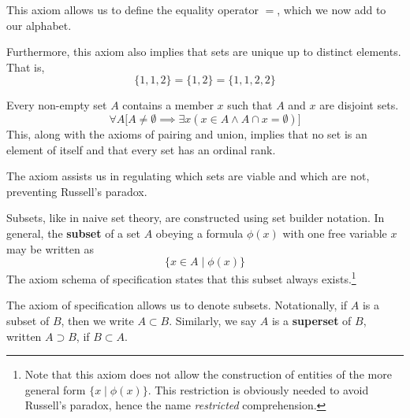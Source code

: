 \documentclass{article}
\begin{document}
    \begin{definition}[Equality]
      This axiom allows us to define the equality operator $=$, which we now add to our alphabet. 
    \end{definition}

    \begin{theorem}
      Furthermore, this axiom also implies that sets are unique up to distinct elements. That is, 
      \begin{equation}
        \{1, 1, 2\} = \{1, 2\} = \{1, 1, 2, 2\}
      \end{equation}
    \end{theorem}

    \begin{axiom}
      Every non-empty set $A$ contains a member $x$ such that $A$ and $x$ are disjoint sets. 
      \begin{equation}
        \forall A \big[ A \neq \emptyset \implies \exists x (x \in A \land A \cap x = \emptyset) \big]
      \end{equation}
      This, along with the axioms of pairing and union, implies that no set is an element of itself and that every set has an ordinal rank. 
    \end{axiom}

    The axiom assists us in regulating which sets are viable and which are not, preventing Russell's paradox. 

    \begin{axiom}
      Subsets, like in naive set theory, are constructed using set builder notation. In general, the \textbf{subset} of a set $A$ obeying a formula $\phi(x)$ with one free variable $x$ may be written as 
      \begin{equation}
        \{x \in A \mid \phi(x) \}
      \end{equation}
      The axiom schema of specification states that this subset always exists.\footnote{Note that this axiom does not allow the construction of entities of the more general form $\{x \mid \phi(x)\}$. This restriction is obviously needed to avoid Russell's paradox, hence the name \textit{restricted} comprehension. } 
    \end{axiom}  

    \begin{definition}
      The axiom of specification allows us to denote subsets. Notationally, if $A$ is a subset of $B$, then we write $A \subset B$. Similarly, we say $A$ is a \textbf{superset} of $B$, written $A \supset B$, if $B \subset A$. 
    \end{definition} 
    
\end{document}
